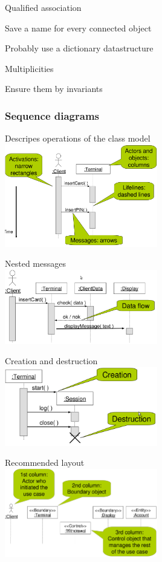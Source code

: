 \documentclass[10pt]{article}
\begin{document}
	\item Qualified association
	\enumstart
		\item Save a name for every connected object
		\item Probably use a dictionary datastructure
	\enumend

	\item Multiplicities
	\enumstart
		\item Ensure them by invariants
	\enumend
\enumend

\subsubsection{Sequence diagrams}
\enumstart
	\item Descripes operations of the class model
	\\ \includegraphics[width=0.5\textwidth]{sequence_diagram.png}

	\item Nested messages
	\\ \includegraphics[width=0.5\textwidth]{nested_messages.png}
	
	\item Creation and destruction
	\\ \includegraphics[width=0.5\textwidth]{creation_destruction.png}
	
	\item Recommended layout
	\\ \includegraphics[width=0.5\textwidth]{recommended_layout.png}
	
\end{document}
